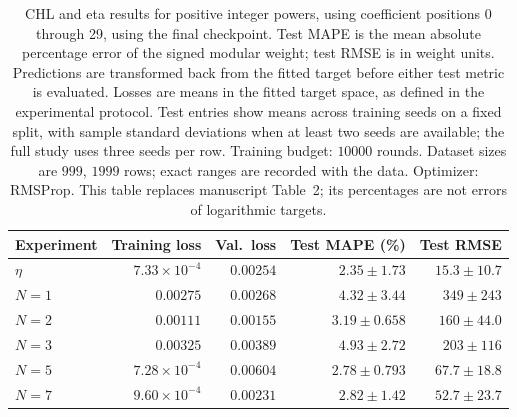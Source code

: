 \begin{table}[!htbp]
\centering
\small
\setlength{\tabcolsep}{4pt}
\renewcommand{\arraystretch}{1.18}
\begin{tabular}{@{}lrrrr@{}}
\toprule
Experiment & Training loss & Val.\ loss & Test MAPE (\%) & Test RMSE \\
\midrule
$\eta$ & $7.33\times10^{-4}$ & $0.00254$ & $2.35\pm1.73$ & $15.3\pm10.7$ \\
$N=1$ & $0.00275$ & $0.00268$ & $4.32\pm3.44$ & $349\pm243$ \\
$N=2$ & $0.00111$ & $0.00155$ & $3.19\pm0.658$ & $160\pm44.0$ \\
$N=3$ & $0.00325$ & $0.00389$ & $4.93\pm2.72$ & $203\pm116$ \\
$N=5$ & $7.28\times10^{-4}$ & $0.00604$ & $2.78\pm0.793$ & $67.7\pm18.8$ \\
$N=7$ & $9.60\times10^{-4}$ & $0.00231$ & $2.82\pm1.42$ & $52.7\pm23.7$ \\
\bottomrule
\end{tabular}
\caption{\textsf{CHL and eta results for positive integer powers, using coefficient positions 0 through 29, using the final checkpoint. Test MAPE is the mean absolute percentage error of the signed modular weight; test RMSE is in weight units. Predictions are transformed back from the fitted target before either test metric is evaluated. Losses are means in the fitted target space, as defined in the experimental protocol. Test entries show means across training seeds on a fixed split, with sample standard deviations when at least two seeds are available; the full study uses three seeds per row. Training budget: $10000$ rounds. Dataset sizes are $999$, $1999$ rows; exact ranges are recorded with the data. Optimizer: RMSProp. This table replaces manuscript Table~2; its percentages are not errors of logarithmic targets.}}
\label{tab:chl-revised-2-final}
\end{table}
